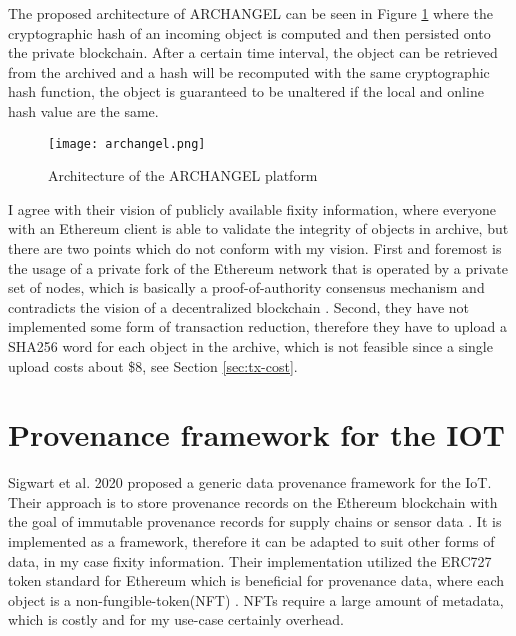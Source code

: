 The proposed architecture of ARCHANGEL can be seen in Figure \ref{fig:archangel} where the cryptographic hash of an incoming object is computed and then persisted onto the private blockchain. After a certain time interval, the object can be retrieved from the archived and a hash will be recomputed with the same cryptographic hash function, the object is guaranteed to be unaltered if the local and online hash value are the same.
\begin{figure}[h]
    \caption{Architecture of the ARCHANGEL platform \cite[2]{collomosse2018archangel}}
    \centering
    \texttt{[image: archangel.png]}\label{fig:archangel}
\end{figure}
I agree with their vision of publicly available fixity information, where everyone with an Ethereum client is able to validate the integrity of objects in archive, but there are two points which do not conform with my vision. First and foremost is the usage of a private fork of the Ethereum network that is operated by a private set of nodes, which is basically a proof-of-authority consensus mechanism and contradicts the vision of a decentralized  blockchain \cite[3]{collomosse2018archangel}. Second, they have not implemented some form of transaction reduction, therefore they have to upload a SHA256 word for each object in the archive, which is not feasible since a single upload costs about \$8, see Section \ref{sec:tx-cost}. 

\section{Provenance framework for the IOT}
Sigwart et al. 2020 proposed a generic data provenance framework for the IoT. Their approach is to store provenance records on the Ethereum blockchain with the goal of immutable provenance records for supply chains or sensor data \cite[4]{Sigwart2020}. It is implemented as a framework, therefore it can be adapted to suit other forms of data, in my case fixity information. Their implementation utilized the ERC727 token standard for Ethereum which is beneficial for provenance data, where each object is a non-fungible-token(NFT) \cite[7]{Sigwart2020}. NFTs require a large amount of metadata, which is costly and for my use-case certainly overhead. 

